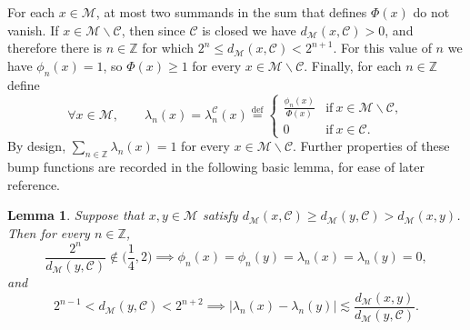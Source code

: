 \documentclass[11pt,reqno]{amsart}
\renewcommand{\le}{\leqslant}
\renewcommand{\ge}{\geqslant}
\renewcommand{\setminus}{\smallsetminus}
\newtheorem{lemma}[theorem]{Lemma}
\theoremstyle{remark}
\newcommand{\MM}{\mathcal{M}}
\newcommand{\Z}{\mathbb Z}
\newcommand{\eqdef}{\stackrel{\mathrm{def}}{=}}
\newcommand{\sub}{\mathscr{C}}
\renewcommand{\1}{\mathbf 1}
\begin{document}
For each $x\in \MM$, at most two summands in the sum that defines $\Phi(x)$ do not vanish. If $x\in \MM\setminus \sub$, then since $\sub$ is closed we have $d_{\MM}(x,\sub)>0$, and therefore there is $n\in \Z$ for which $2^n\le d_{\MM}(x,\sub)< 2^{n+1}$. For this value of $n$ we have $\phi_n(x)=1$, so $\Phi(x)\ge 1$ for every $x\in \MM\setminus \sub$. Finally, for each $n\in \Z$ define
$$
\forall x\in \MM,\qquad  \lambda_n(x)=\lambda_n^\sub(x)\eqdef \left\{\begin{array}{ll}\frac{\phi_n(x)}{\Phi(x)} &\mathrm{if}\ x\in \MM\setminus \sub,
\\ 0 &\mathrm{if}\ x\in \sub.\end{array}\right.
$$
By design, $\sum_{n\in \Z}\lambda_n(x)=1$ for every $x\in \MM\setminus \sub$. Further properties of these bump functions are recorded in the following basic lemma, for ease of later reference.
\begin{lemma}\label{lem:lambdam lip}
Suppose that $x,y\in \MM$ satisfy $d_{\MM}(x,\sub)\ge d_{\MM}(y,\sub)>d_{\MM}(x,y)$. Then for every $n\in \Z$,
\begin{equation}\label{eq:phi support}
\frac{2^n}{d_{\MM}(y,\sub)}\notin \Big(\frac14, 2\Big)\implies \phi_n(x)=\phi_n(y)=\lambda_n(x)=\lambda_n(y)=0,
\end{equation}
and
\begin{equation}\label{eq:lambda m lip}
2^{n-1}< d_{\MM}(y,\sub)< 2^{n+2}\implies \big|\lambda_n(x)-\lambda_n(y)\big|\lesssim \frac{d_{\MM}(x,y)}{d_{\MM}(y,\sub)}.
\end{equation}
\end{lemma}
\end{document}

